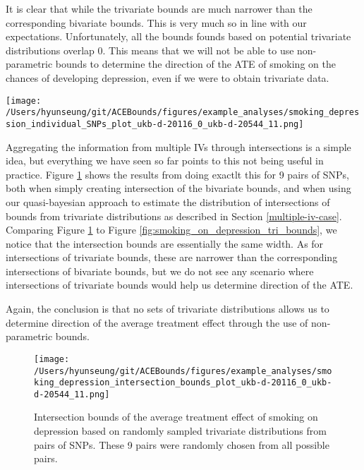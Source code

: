 \documentclass[
]{article}
\theoremstyle{plain}
\begin{document}
{It is clear that while the trivariate bounds are much narrower than the corresponding bivariate bounds. This is very much so in line with our expectations. Unfortunately, all the bounds founds based on potential trivariate distributions overlap 0. This means that we will not be able to use non-parametric bounds to determine the direction of the ATE of smoking on the chances of developing depression, even if we were to obtain trivariate data.

\clearpage

\begin{sidewaysfigure}
  \texttt{[image: /Users/hyunseung/git/ACEBounds/figures/example\_analyses/smoking\_depression\_individual\_SNPs\_plot\_ukb-d-20116\_0\_ukb-d-20544\_11.png]}
    \caption{500 sets of bounds of the average treatment effect of smoking on depression for each of the 84 SNPs. Each bound is based on a set of values for the trivariate distribution randomly sampled. Bounds are color coded to show if they overlap 0 (grey) or do not (red). All bounds overlap 0.}
    \label{fig:smoking_on_depression_tri_bounds}
\end{sidewaysfigure}

\clearpage

Aggregating the information from multiple IVs through intersections is a simple idea, but everything we have seen so far points to this not being useful in practice. Figure \ref{fig:smoking_on_depression_intersections} shows the results from doing exactlt this for 9 pairs of SNPs, both when simply creating intersection of the bivariate bounds, and when using our quasi-bayesian approach to estimate the distribution of intersections of bounds from trivariate distributions as described in Section \ref{multiple-iv-case}. Comparing Figure \ref{fig:smoking_on_depression_intersections} to Figure \ref{fig:smoking_on_depression_tri_bounds}, we notice that the intersection bounds are essentially the same width. As for intersections of trivariate bounds, these are narrower than the corresponding intersections of bivariate bounds, but we do not see any scenario where intersections of trivariate bounds would help us determine direction of the ATE.

Again, the conclusion is that no sets of trivariate distributions allows us to determine direction of the average treatment effect through the use of non-parametric bounds.

\begin{figure}[H]
  \centering
  \texttt{[image: /Users/hyunseung/git/ACEBounds/figures/example\_analyses/smoking\_depression\_intersection\_bounds\_plot\_ukb-d-20116\_0\_ukb-d-20544\_11.png]}
  \caption{Intersection bounds of the average treatment effect of smoking on depression based on randomly sampled trivariate distributions from pairs of SNPs. These 9 pairs were randomly chosen from all possible pairs.}
  \label{fig:smoking_on_depression_intersections}
\end{figure}

}
\end{document}

